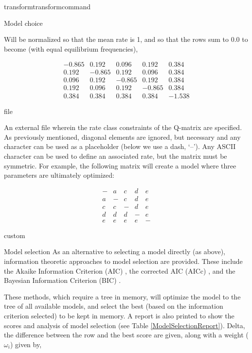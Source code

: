 \begin{command}{transform}{transformcommand}
\begin{arguments}
\begin {argumentgroup} {Model choice}
{Will be normalized so that the mean rate is 1, and so
that the rows sum to 0.0 to become (with equal equilibrium
frequencies),

\begin{equation*}
\begin{array}{rrrrr}
-0.865 & 0.192 & 0.096 & 0.192 & 0.384 \\
0.192 & -0.865 & 0.192 & 0.096 & 0.384 \\
0.096 & 0.192 & -0.865 & 0.192 & 0.384 \\
0.192 & 0.096 & 0.192 & -0.865 & 0.384 \\
0.384 & 0.384 & 0.384 & 0.384 & -1.538
\end{array}
\end{equation*} }
{file}

{An external file wherein the rate class constraints of
the Q-matrix are specified. As previously mentioned,
diagonal elements are ignored, but necessary and any character can
be used as a placeholder (below we use a dash, `--'). Any
ASCII character can be used to define an associated
rate, but the matrix must be symmetric. For example, the
following matrix will create a model where three
parameters are ultimately optimized:

\begin{equation*}
\begin{array}{ccccc}
- & a & c & d & e \\
a & - & c & d & e \\
c & c & - & d & e \\
d & d & d & - & e \\
e & e & e & e & -
\end{array}
\end{equation*}


}
{custom}

\end{argumentgroup}


\begin {argumentgroup}{Model selection}    
As an alternative to selecting a model directly (as above), information 
theoretic approaches to model selection are provided.
These include the Akaike Information Criterion (AIC)
\cite{akaike1973}, the corrected AIC (AICc)
\cite{sugiura1978}, and the Bayesian Information Criterion (BIC)
\cite{schwarz1978}.

These methods, which require a tree in memory, will optimize the model
to the tree of all available models, and select the best (based
on the information criterion selected) to be kept in memory. A
report is also printed to show the scores and analysis of model
selection (see Table \ref {ModelSelectionReport}). Delta, the 
difference between the row and the best score are given, along
with a weight (${\omega_i}$) given by,


\end{argumentgroup}
\end{arguments}
\end{command}
